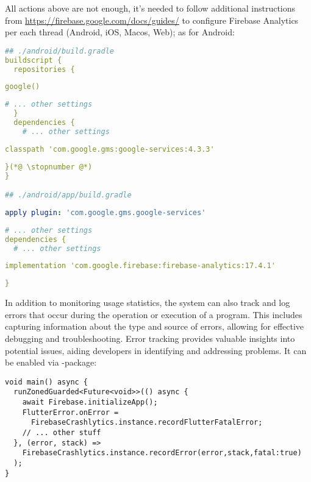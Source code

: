 \noindent All actions above are not enough, it's needed to follow additional instructions from  
\href{https://firebase.google.com/docs/guides/}{https://firebase.google.com/docs/guides/} to configure
Firebase Analytics per each thread (Android, iOS, Macos, Web); as for Android:

\begin{lstlisting}[language=yaml]
## ./android/build.gradle
buildscript {
  repositories {
\end{lstlisting}
{
\xpretocmd{\lstlisting}{\vspace{-12pt}}{}{}
\begin{lstlisting}[firstnumber=4, language=yaml, backgroundcolor=\color{backgreen}]
      google()
\end{lstlisting}
\begin{lstlisting}[firstnumber=5, language=yaml]
      # ... other settings
  }
  dependencies {
    # ... other settings
\end{lstlisting}
\begin{lstlisting}[firstnumber=9, language=yaml, backgroundcolor=\color{backgreen}]
    classpath 'com.google.gms:google-services:4.3.3'
\end{lstlisting}
\begin{lstlisting}[firstnumber=10, language=yaml]
  }(*@ \stopnumber @*)
}

## ./android/app/build.gradle
\end{lstlisting}
\begin{lstlisting}[firstnumber=2, language=yaml, backgroundcolor=\color{backgreen}]
apply plugin: 'com.google.gms.google-services'
\end{lstlisting}
\begin{lstlisting}[firstnumber=3, language=yaml]
# ... other settings
dependencies {
  # ... other settings
\end{lstlisting}
\begin{lstlisting}[firstnumber=6, language=yaml, backgroundcolor=\color{backgreen}]
  implementation 'com.google.firebase:firebase-analytics:17.4.1'
\end{lstlisting}
\begin{lstlisting}[firstnumber=7, language=yaml]
}
\end{lstlisting}
}

\noindent In addition to monitoring usage statistics, the system can also track and log errors that occur during the 
operation or execution of a program. This includes capturing information about the type and source of errors, 
allowing for effective debugging and troubleshooting. Error tracking provides valuable insights into potential issues, 
aiding developers in identifying and addressing problems. It can be enabled via -package:

\begin{lstlisting}
void main() async {
  runZonedGuarded<Future<void>>(() async {
    await Firebase.initializeApp();
    FlutterError.onError =
      FirebaseCrashlytics.instance.recordFlutterFatalError;
    // ... other stuff
  }, (error, stack) =>
    FirebaseCrashlytics.instance.recordError(error,stack,fatal:true)
  );
}
\end{lstlisting}

